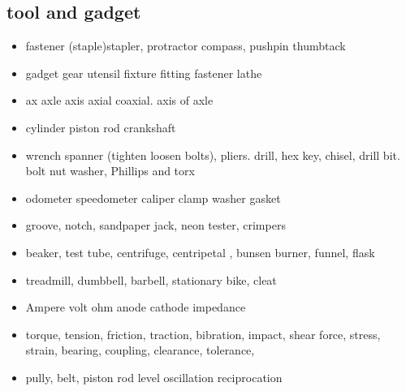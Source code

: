 \documentclass[a4paper,11pt,twoside]{book}
\begin{document}
\subsection{tool and gadget}
\begin{itemize}
	\item fastener (staple)stapler, protractor compass, pushpin thumbtack 
	\item gadget gear utensil fixture fitting fastener lathe
	
	\item ax axle axis axial coaxial. axis of axle
	
	\item cylinder piston rod crankshaft

	\item wrench spanner (tighten loosen bolts), pliers. drill, hex key, chisel, drill bit. bolt nut washer, Phillips and torx
	
	\item odometer speedometer caliper clamp washer gasket 
	
	\item groove, notch, sandpaper jack, neon tester, crimpers 
	 
	\item beaker, test tube, centrifuge, centripetal , bunsen burner, funnel, flask 
		
	\item treadmill, dumbbell, barbell, stationary bike, cleat
		
	\item Ampere volt ohm anode cathode impedance
		
	\item torque, tension, friction, traction, bibration, impact, shear force, stress, strain,  bearing, coupling, clearance, tolerance,
	
	\item pully, belt, piston rod level oscillation reciprocation 
\end{itemize}	
\end{document}
